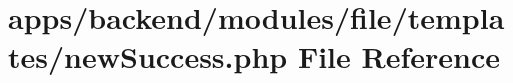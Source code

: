 \hypertarget{backend_2modules_2file_2templates_2new_success_8php}{\section{apps/backend/modules/file/templates/new\-Success.php File Reference}
\label{backend_2modules_2file_2templates_2new_success_8php}
}

